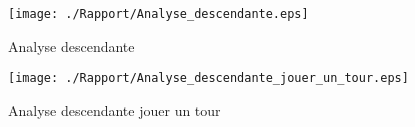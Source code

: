 \begin{figure}[ht]
  \centering
  \texttt{[image: ./Rapport/Analyse\_descendante.eps]}
  \caption{Analyse descendante}
  \texttt{[image: ./Rapport/Analyse\_descendante\_jouer\_un\_tour.eps]}
  \caption{Analyse descendante jouer un tour}
\end{figure}
